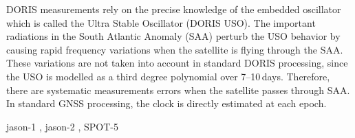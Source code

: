 DORIS measurements rely on the precise knowledge of the embedded oscillator which is called the Ultra Stable Oscillator (DORIS USO). The important radiations in the South Atlantic Anomaly (SAA) perturb the USO behavior by causing rapid frequency variations when the satellite is flying through the SAA. These variations are not taken into account in standard DORIS processing, since the USO is modelled as a third degree polynomial over 7–10 days. Therefore, there are systematic measurements errors when the satellite passes through SAA. In standard GNSS processing, the clock is directly estimated at each epoch.

\gls{jason}-1 \cite{Willis2003}, \gls{jason}-2 \cite{Willis2016}, SPOT-5 \cite{Stepanek2013}
